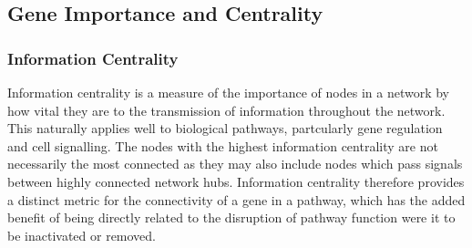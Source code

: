 \begin{table*}[!htb]
\caption{ANOVA for Synthetic Lethality and Vertex Degree}
\label{tab:SL_Pathway_PI3K_Vertex_Degree}
\noindent{}
\end{table*}

\FloatBarrier

\subsection{Gene Importance and Centrality}  \label{chapt4:Network_Centrality}

\subsubsection{Information Centrality}  \label{chapt4:Network_InfoCent}

Information centrality is a measure of the importance of nodes in a network by how vital they are to the transmission of information throughout the network. This naturally applies well to biological pathways, partcularly gene regulation and cell signalling. The nodes with the highest information centrality are not necessarily the most connected as they may also include nodes which pass signals between highly connected network hubs. Information centrality therefore provides a distinct metric for the connectivity of a gene in a pathway, which has the added benefit of being directly related to the disruption of pathway function were it to be inactivated or removed.


